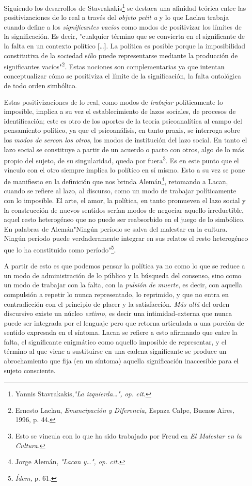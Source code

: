 \documentclass{book}
\begin{document}
Siguiendo los desarrollos de Stavrakakis\footnote{Yannis
  Stavrakakis,\emph{"La izquierda\ldots", op. cit.}} se destaca una
afinidad teórica entre las positivizaciones de lo real a través del
\emph{objeto petit a} y lo que Laclau trabaja cuando define a los
\emph{significantes vacíos} como modos de positivizar los límites de la
significación. Es decir, "cualquier término que se convierta en el
significante de la falta en un contexto político {[}\ldots{]}. La
política es posible porque la imposibilidad constitutiva de la sociedad
sólo puede representarse mediante la producción de significantes
vacíos"\footnote{Ernesto Laclau, \emph{Emancipación y Diferencia,}
  Espaza Calpe, Buenos Aires, 1996, p. 44.}. Estas nociones son
complementarias ya que intentan conceptualizar cómo se positiviza el
límite de la significación, la falta ontológica de todo orden simbólico.

Estas positivizaciones de lo real, como modos de \emph{trabajar}
políticamente lo imposible, implica a su vez el establecimiento de lazos
sociales, de procesos de identificación; este es otro de los aportes de
la teoría psicoanalítica al campo del pensamiento político, ya que el
psicoanálisis, en tanto praxis, se interroga sobre los \emph{modos de
sercon los otros}, los modos de institución del lazo social. En tanto el
lazo social se constituye a partir de un acuerdo o pacto con otros, algo
de lo más propio del sujeto, de su singularidad, queda por
fuera\footnote{Esto se vincula con lo que ha sido trabajado por Freud en
  \emph{El Malestar en la Cultura.}}. Es en este punto que el vínculo
con el otro siempre implica lo político en sí mismo. Esto a su vez se
pone de manifiesto en la definición que nos brinda Alemán\footnote{Jorge
  Alemán, \emph{"Lacan y\ldots", op. cit.}}, retomando a Lacan, cuando
se refiere al lazo, al discurso, como un modo de trabajar políticamente
con lo imposible. El arte, el amor, la política, en tanto promueven el
lazo social y la construcción de nuevos sentidos serían modos de
negociar aquello irreductible, aquel resto heterogéneo que no puede ser
reabsorbido en el juego de lo simbólico. En palabras de Alemán"Ningún
período se salva del malestar en la cultura. Ningún período puede
verdaderamente integrar en sus relatos el resto heterogéneo que lo ha
constituido como período"\footnote{\emph{Ídem,} p. 61.}.

A partir de esto es que podemos pensar la política ya no como lo que se
reduce a un modo de administración de lo público y la búsqueda del
consenso, sino como un modo de trabajar con la falta, con la
\emph{pulsión de muerte}, es decir, con aquella compulsión a repetir lo
nunca representado, lo reprimido, y que no entra en contradicción con el
principio de placer y la satisfacción. \emph{Más allá} del orden
discursivo existe un núcleo \emph{extimo,} es decir una
intimidad-externa que nunca puede ser integrada por el lenguaje pero que
retorna articulada a una porción de sentido expresada en el síntoma.
Lacan se refiere a esto afirmando que entre la falta, el significante
enigmático como aquello imposible de representar, y el término al que
viene a sustituirse en una cadena significante se produce un
abrochamiento que fija (en un síntoma) aquella significación inaccesible
para el sujeto consciente.
\end{document}
